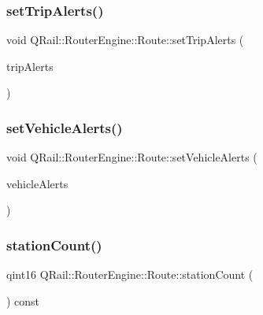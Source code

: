 \mbox{\label{classQRail_1_1RouterEngine_1_1Route_a53b1077306e800418be4923643821179}} 
\subsubsection{\texorpdfstring{setTripAlerts()}{setTripAlerts()}}
{\footnotesize\ttfamily void Q\+Rail\+::\+Router\+Engine\+::\+Route\+::set\+Trip\+Alerts (\begin{DoxyParamCaption}\item[{const Q\+List$<$ \mbox{\hyperlink{classQRail_1_1AlertsEngine_1_1Message}{Q\+Rail\+::\+Alerts\+Engine\+::\+Message}} $\ast$ $>$ \&}]{trip\+Alerts }\end{DoxyParamCaption})}

\mbox{\label{classQRail_1_1RouterEngine_1_1Route_ae902cb90a4a767ab8fa1dc38a6cc8e35}} 
\subsubsection{\texorpdfstring{setVehicleAlerts()}{setVehicleAlerts()}}
{\footnotesize\ttfamily void Q\+Rail\+::\+Router\+Engine\+::\+Route\+::set\+Vehicle\+Alerts (\begin{DoxyParamCaption}\item[{const Q\+List$<$ \mbox{\hyperlink{classQRail_1_1AlertsEngine_1_1Message}{Q\+Rail\+::\+Alerts\+Engine\+::\+Message}} $\ast$ $>$ \&}]{vehicle\+Alerts }\end{DoxyParamCaption})}

\mbox{\label{classQRail_1_1RouterEngine_1_1Route_af2e7e13f00ef8079750a7012af2674e4}} 
\subsubsection{\texorpdfstring{stationCount()}{stationCount()}}
{\footnotesize\ttfamily qint16 Q\+Rail\+::\+Router\+Engine\+::\+Route\+::station\+Count (\begin{DoxyParamCaption}{ }\end{DoxyParamCaption}) const}

